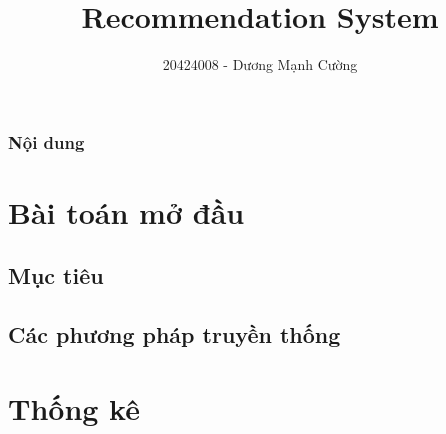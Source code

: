 \documentclass{beamer}
\title[Seminar ]{Recommendation System} %
\author{20424008 - Dương Mạnh Cường} %
\institute[UCLA] %
{
Đại học Khoa Học Tự Nhiên - ĐHQG\\ %
\medskip
\textit{Thành phố Hồ Chí Minh} %
}
\date{} %
\begin{document}
\begin{frame}
\titlepage %
\end{frame}

\begin{frame}
\frametitle{Nội dung} %
\tableofcontents %
\end{frame}


\section{Bài toán mở đầu} %

\subsection{Mục tiêu} %
\subsection{Các phương pháp truyền thống} %
\section{Thống kê} %
\end{document}
